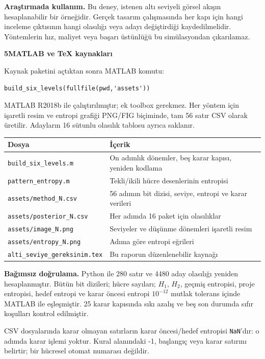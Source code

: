 \documentclass[11pt,a4paper]{article}
\newcommand{\heading}[2]{{\sffamily\small\color{blue!40!black}#1}\par{\sffamily\LARGE\bfseries#2}\par\vspace{3mm}}
\newcommand{\page}[2]{\newpage\heading{#1}{#2}}
\begin{document}
\textbf{Araştırmada kullanım.} Bu deney, istenen altı seviyeli görsel akışın
hesaplanabilir bir örneğidir. Gerçek tasarım çalışmasında her kapı için
hangi inceleme çıktısının hangi olasılığı veya adayı değiştirdiği kaydedilmelidir.
Yöntemlerin hız, maliyet veya başarı üstünlüğü bu simülasyondan çıkarılamaz.

\page{Yeniden üretim ve doğrulama}{5\quad MATLAB ve TeX kaynakları}
Kaynak paketini açtıktan sonra MATLAB komutu:
\begin{verbatim}
build_six_levels(fullfile(pwd,'assets'))
\end{verbatim}
MATLAB R2018b ile çalıştırılmıştır; ek toolbox gerekmez. Her yöntem için
işaretli resim ve entropi grafiği PNG/FIG biçiminde, tam 56 satır CSV olarak
üretilir. Adayların 16 sütunlu olasılık tablosu ayrıca saklanır.

\begin{center}\small\begin{tabular}{p{66mm}p{84mm}}\toprule
Dosya & İçerik\\\midrule
\texttt{build\_six\_levels.m} & On adımlık dönemler, beş karar kapısı, yeniden kodlama\\
\texttt{pattern\_entropy.m} & Tekli/ikili hücre desenlerinin entropisi\\
\texttt{assets/method\_N.csv} & 56 adımın bit dizisi, seviye, entropi ve karar verileri\\
\texttt{assets/posterior\_N.csv} & Her adımda 16 paket için olasılıklar\\
\texttt{assets/image\_N.png} & Seviyeler ve düşünme dönemleri işaretli resim\\
\texttt{assets/entropy\_N.png} & Adıma göre entropi eğrileri\\
\texttt{alti\_seviye\_gereksinim.tex} & Bu raporun düzenlenebilir kaynağı\\\bottomrule
\end{tabular}\end{center}

\textbf{Bağımsız doğrulama.} Python ile 280 satır ve 4480 aday olasılığı
yeniden hesaplanmıştır. Bütün bit dizileri; hücre sayıları; $H_1$, $H_2$,
geçmiş entropisi, proje entropisi, hedef entropi ve karar öncesi entropi
$10^{-12}$ mutlak tolerans içinde MATLAB ile eşleşmiştir. 25 karar kapısında
sıkı azalış ve beş son durumda sıfır koşulları kontrol edilmiştir.

CSV dosyalarında karar olmayan satırların karar öncesi/hedef entropisi
\texttt{NaN}'dır: o adımda karar işlemi yoktur. Kural alanındaki -1,
başlangıç veya karar satırını belirtir; bir hücresel otomat numarası değildir.
\end{document}
